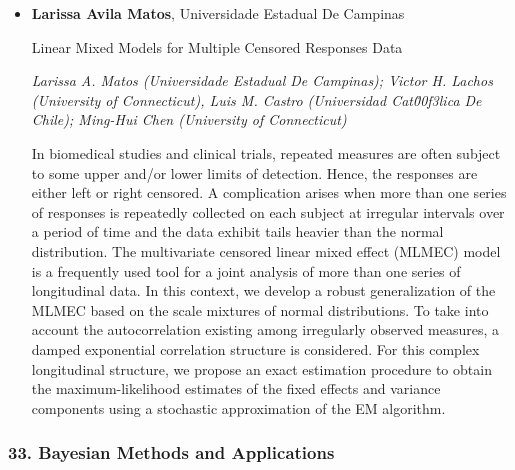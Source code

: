 \begin{itemize}
\item \textbf{Larissa Avila Matos}, Universidade Estadual De Campinas

Linear Mixed Models for Multiple Censored Responses Data

\emph{\footnotesize Larissa A. Matos (Universidade Estadual De Campinas); Victor H. Lachos (University of Connecticut),  Luis M. Castro (Universidad Cat\u00f3lica De Chile); Ming-Hui Chen (University of Connecticut)}

In biomedical studies and clinical trials, repeated measures are often subject to some upper and/or lower limits of detection. Hence, the responses are either left or right censored. A complication arises when more than one series of responses is repeatedly collected on each subject at irregular intervals over a period of time and the data exhibit tails heavier than the normal distribution. The multivariate censored linear mixed effect (MLMEC) model is a frequently used tool for a joint analysis of more than one series of longitudinal data. In this context, we develop a robust generalization of the MLMEC based on the scale mixtures of normal distributions. To take into account the autocorrelation existing among irregularly observed measures, a damped exponential correlation structure is considered. For this complex longitudinal structure, we propose an exact estimation procedure to obtain the maximum-likelihood estimates of the fixed effects and variance components using a stochastic approximation of the EM algorithm. 


\end{itemize}

\subsubsection*{33. Bayesian Methods and Applications}

